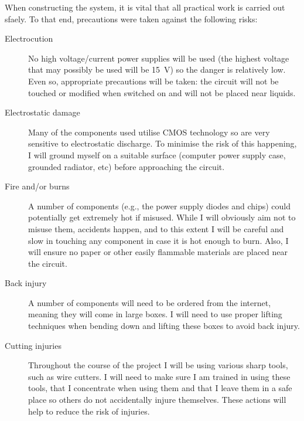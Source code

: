 \documentclass[12pt,a4paper]{report}
\begin{document}
When constructing the system, it is vital that all practical work is carried out
sfaely. To that end, precautions were taken against the following risks:

\begin{description}
  \item[Electrocution] No high voltage/current power supplies will be used (the
  highest voltage that may possibly be used will be \SI{15}{\volt}) so the
  danger is relatively low. Even so, appropriate precautions will be taken: the
  circuit will not be touched or modified when switched on and will not be
  placed near liquids.

  \item[Electrostatic damage] Many of the components used utilise CMOS
  technology so are very sensitive to electrostatic discharge. To minimise the
  risk of this happening, I will ground myself on a suitable surface (computer
  power supply case, grounded radiator, etc) before approaching the circuit.

  \item[Fire and/or burns] A number of components (e.g., the power supply diodes
  and chips) could potentially get extremely hot if misused. While I will
  obviously aim not to misuse them, accidents happen, and to this extent I will
  be careful and slow in touching any component in case it is hot enough to
  burn. Also, I will ensure no paper or other easily flammable materials are
  placed near the circuit.

  \item[Back injury] A number of components will need to be ordered from the
  internet, meaning they will come in large boxes. I will need to use proper
  lifting techniques when bending down and lifting these boxes to avoid back
  injury.

  \item[Cutting injuries] Throughout the course of the project I will be using
  various sharp tools, such as wire cutters. I will need to make sure I am
  trained in using these tools, that I concentrate when using them and that I
  leave them in a safe place so others do not accidentally injure themselves.
  These actions will help to reduce the risk of injuries.
\end{description}
\end{document}
